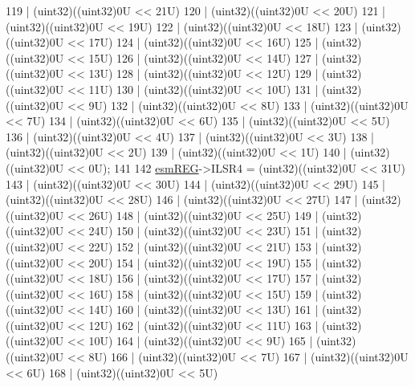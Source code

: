 \begin{DoxyCode}
119                   | (uint32)((uint32)0U << 21U)
120                   | (uint32)((uint32)0U << 20U)
121                   | (uint32)((uint32)0U << 19U)
122                   | (uint32)((uint32)0U << 18U)
123                   | (uint32)((uint32)0U << 17U)
124                   | (uint32)((uint32)0U << 16U)
125                   | (uint32)((uint32)0U << 15U)
126                   | (uint32)((uint32)0U << 14U)
127                   | (uint32)((uint32)0U << 13U)
128                   | (uint32)((uint32)0U << 12U)
129                   | (uint32)((uint32)0U << 11U)
130                   | (uint32)((uint32)0U << 10U)
131                   | (uint32)((uint32)0U <<  9U)
132                   | (uint32)((uint32)0U <<  8U)
133                   | (uint32)((uint32)0U <<  7U)
134                   | (uint32)((uint32)0U <<  6U)
135                   | (uint32)((uint32)0U <<  5U)
136                   | (uint32)((uint32)0U <<  4U)
137                   | (uint32)((uint32)0U <<  3U)
138                   | (uint32)((uint32)0U <<  2U)
139                   | (uint32)((uint32)0U <<  1U)
140                   | (uint32)((uint32)0U <<  0U);
141 
142     \mbox{\hyperlink{reg__esm_8h_a7c2e779f2973e0c2c9496a4796df10f1}{esmREG}}->ILSR4 = (uint32)((uint32)0U << 31U)
143                   | (uint32)((uint32)0U << 30U)
144                   | (uint32)((uint32)0U << 29U)
145                   | (uint32)((uint32)0U << 28U)
146                   | (uint32)((uint32)0U << 27U)
147                   | (uint32)((uint32)0U << 26U)
148                   | (uint32)((uint32)0U << 25U)
149                   | (uint32)((uint32)0U << 24U)
150                   | (uint32)((uint32)0U << 23U)
151                   | (uint32)((uint32)0U << 22U)
152                   | (uint32)((uint32)0U << 21U)
153                   | (uint32)((uint32)0U << 20U)
154                   | (uint32)((uint32)0U << 19U)
155                   | (uint32)((uint32)0U << 18U)
156                   | (uint32)((uint32)0U << 17U)
157                   | (uint32)((uint32)0U << 16U)
158                   | (uint32)((uint32)0U << 15U)
159                   | (uint32)((uint32)0U << 14U)
160                   | (uint32)((uint32)0U << 13U)
161                   | (uint32)((uint32)0U << 12U)
162                   | (uint32)((uint32)0U << 11U)
163                   | (uint32)((uint32)0U << 10U)
164                   | (uint32)((uint32)0U <<  9U)
165                   | (uint32)((uint32)0U <<  8U)
166                   | (uint32)((uint32)0U <<  7U)
167                   | (uint32)((uint32)0U <<  6U)
168                   | (uint32)((uint32)0U <<  5U)

\end{DoxyCode}
